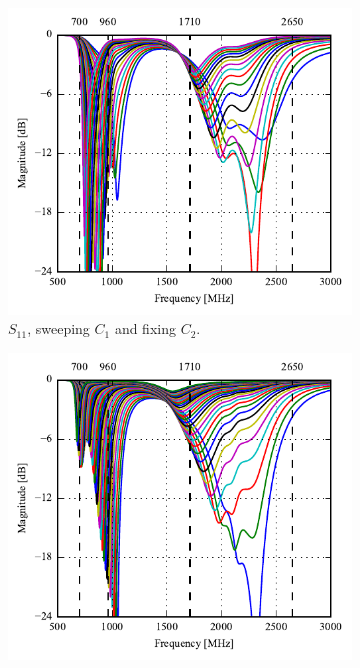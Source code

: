 \begin{figure}[htbp]
   \begin{subfigure}[b]{0.49\linewidth}
        \centering
        \includegraphics{img/tech_sol/monopole/5mm/sweep_s11}
        \caption{$S_{11}$, sweeping $C_1$ and fixing $C_2$.}
    \end{subfigure}
    \hfill
    \begin{subfigure}[b]{0.49\linewidth}
        \centering
        \includegraphics{img/tech_sol/monopole/5mm/sweep_S22_12p}

\end{subfigure}
\end{figure}
